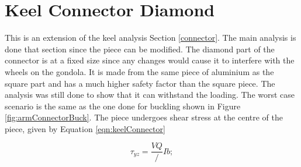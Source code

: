 \documentclass[../main.tex]{subfiles}
\begin{document}
\section{Keel Connector Diamond}
This is an extension of the keel analysis Section \ref{connector}. The main analysis is done that section since the piece can be modified. The diamond part of the connector is at a fixed size since any changes would cause it to interfere with the wheels on the gondola. It is made from the same piece of aluminium as the square part and has a much higher safety factor than the square piece. The analysis was still done to show that it can withstand the loading. The worst case scenario is the same as the one done for buckling shown in Figure \ref{fig:armConnectorBuck}. The piece undergoes shear stress at the centre of the piece, given by Equation \ref{eqn:keelConnector}

\begin{equation} \label{eqn:keelConnector}
\tau_{yz} = \frac{VQ}/{Ib};
\end{equation}
\end{document}
